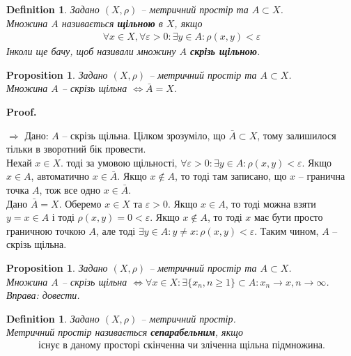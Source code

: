 \documentclass[a4paper, 10pt]{article}
\makeatletter
\def\rightproof{$\boxed{\Rightarrow}$ }
\theoremstyle{theoremdd}
\theoremstyle{theoremdd}
\newtheorem{definition}[theorem]{Definition}
\theoremstyle{theoremdd}
\theoremstyle{theoremdd}
\theoremstyle{theoremdd}
\newtheorem{proposition}[theorem]{Proposition}
\theoremstyle{theoremdd}
\theoremstyle{theoremdd}
\theoremstyle{theoremdd}
\renewenvironment{proof}[1][Proof.\\]{\par
\pushQED{\hfill \qed}%
\normalfont \topsep6\p@\@plus6\p@\relax
\trivlist
\item\relax
{\bfseries
#1\@addpunct{.}}\hspace\labelsep\ignorespaces
}{%
\popQED\endtrivlist\@endpefalse
}
\makeatother
\begin{document}
\begin{definition} Задано $(X, \rho)$ -- метричний простір та $A \subset X$.\\
Множина $A$ називається \textbf{щільною} в $X$, якщо
\begin{align*}
\forall x \in X, \forall \varepsilon > 0: \exists y \in A: \rho(x,y) < \varepsilon
\end{align*}
Інколи ще бачу, щоб називали множину $A$ \textbf{скрізь щільною}.
\end{definition}

\begin{proposition}
Задано $(X, \rho)$ -- метричний простір та $A \subset X$.\\
Множина $A$ -- скрізь щільна $\iff \bar{A} = X$.
\end{proposition}

\begin{proof}
\rightproof Дано: $A$ -- скрізь щільна. Цілком зрозуміло, що $\bar{A} \subset X$, тому залишилося тільки в зворотний бік провести.\\
Нехай $x \in X$. тоді за умовою щільності, $\forall \varepsilon > 0: \exists y \in A: \rho(x,y) < \varepsilon$. Якщо $x \in A$, автоматично $x \in \bar{A}$. Якщо $x \notin A$, то тоді там записано, що $x$ -- гранична точка $A$, тож все одно $x \in \bar{A}$.
\bigskip \\
Дано $\bar{A} = X$. Оберемо $x \in X$ та $\varepsilon > 0$. Якщо $x \in A$, то тоді можна взяти $y = x \in A$ і тоді $\rho(x,y) = 0 < \varepsilon$. Якщо $x \notin A$, то тоді $x$ має бути просто граничною точкою $A$, але тоді $\exists y \in A: y \neq x: \rho(x,y) < \varepsilon$. Таким чином, $A$ -- скрізь щільна.
\end{proof}

\begin{proposition}
Задано $(X, \rho)$ -- метричний простір та $A \subset X$.\\
Множина $A$ -- скрізь щільна $\iff \forall x \in X: \exists \{x_n, n \geq 1\} \subset A: x_n \to x, n \to \infty$.\\
\textit{Вправа: довести.}
\end{proposition}

\begin{definition}
Задано $(X, \rho)$ -- метричний простір.\\
Метричний простір називається \textbf{сепарабельним}, якщо
\begin{align*}
\text{існує в даному просторі скінченна чи зліченна щільна підмножина.}
\end{align*}
\end{definition}
\end{document}
